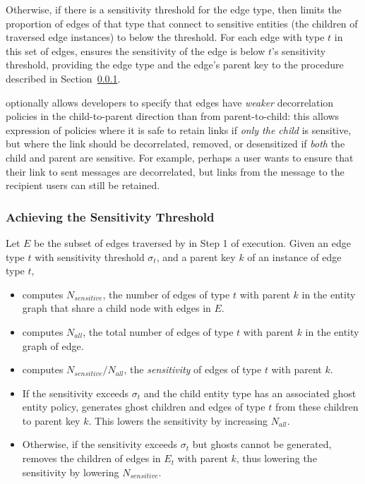 \begin{enumerate}
        Otherwise, if there is a sensitivity threshold for the edge type, then \sys{} limits the
        proportion of edges of that type that connect to sensitive entities (the children of
        traversed edge instances) to below the threshold. 
        For each edge with type $t$ in this set of edges, \sys{} ensures the
        sensitivity of the edge is below $t$'s sensitivity threshold, providing the edge type and the edge's
        parent key to the procedure described in Section~\ref{sensitivity_algo}. 

        \sys{} optionally allows developers to specify that edges have \emph{weaker}
        decorrelation policies in the child-to-parent direction than from parent-to-child: this
        allows expression of policies where it is safe to retain links if \emph{only the child} is
        sensitive, but where the link should be decorrelated, removed, or desensitized if
        \emph{both} the child
        and parent are sensitive. For example, perhaps a user wants to ensure that their link to
        sent messages are decorrelated, but links from the message to the recipient users 
        can still be retained.
\end{enumerate}

\subsubsection{Achieving the Sensitivity Threshold}
\label{sensitivity_algo}
Let $E$ be the subset of edges traversed by \sys{} in Step 1 of execution. 
Given an edge type $t$ with sensitivity threshold $\sigma_t$, and a parent key $k$ of an instance of
edge type $t$, 
    \begin{itemize}
        \item \sys{} computes $N_{sensitive}$, the number of edges of type $t$ with parent $k$ in the entity graph that share 
            a child node with edges in $E$.
        \item \sys{} computes $N_{all}$, the total number of edges of type $t$ with parent $k$
            in the entity graph of edge.
        \item \sys{} computes $N_{sensitive}/N_{all}$, the \emph{sensitivity} of edges of type $t$
            with parent $k$.
        \item If the sensitivity exceeds $\sigma_t$ and the child entity type has an associated ghost entity policy, \sys{}
            generates ghost children and edges of type $t$ from these children to parent
            key $k$. This lowers the sensitivity by increasing $N_{all}$.
        \item Otherwise, if the sensitivity exceeds $\sigma_t$ but ghosts cannot be generated,
            \sys{} removes the children of edges in $E_t$ with parent $k$, thus lowering the
            sensitivity by lowering $N_{sensitive}$.
    \end{itemize}

